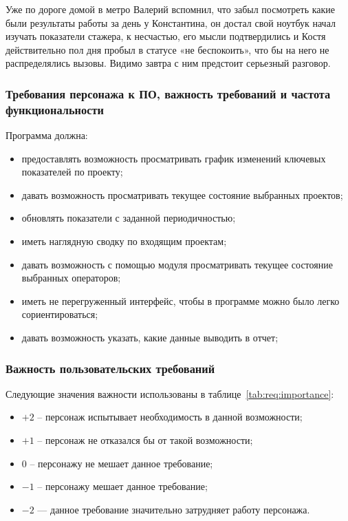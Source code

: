 Уже по дороге домой в метро Валерий вспомнил, что забыл посмотреть какие были результаты работы за день у Константина, он достал свой ноутбук начал изучать показатели стажера, к несчастью, его мысли подтвердились и Костя действительно пол дня пробыл в статусе «не беспокоить», что бы на него не распределялись вызовы. Видимо завтра с ним предстоит серьезный разговор.

\subsubsection{Требования персонажа к ПО, важность требований и частота функциональности}

Программа должна:
\begin{itemize}
    \item предоставлять возможность просматривать график изменений ключевых показателей по проекту;
    \item давать возможность просматривать текущее состояние выбранных проектов;
    \item обновлять показатели с заданной периодичностью;
    \item иметь наглядную сводку по входящим проектам;
    \item давать возможность с помощью модуля просматривать текущее состояние выбранных операторов;
    \item иметь не перегруженный интерфейс, чтобы в программе можно было легко сориентироваться;
    \item давать возможность указать, какие данные выводить в отчет;
\end{itemize}

\subsubsection{Важность пользовательских требований}

Следующие значения важности использованы в таблице~\ref{tab:req:importance}:
\begin{itemize}
    \item $+2$ -- персонаж испытывает необходимость в данной возможности;
    \item $+1$ -- персонаж не отказался бы от такой возможности;
    \item $0$ -- персонажу не мешает данное требование;
    \item $-1$ -- персонажу мешает данное требование;
    \item $-2$ --- данное требование значительно затрудняет работу персонажа.
\end{itemize}

